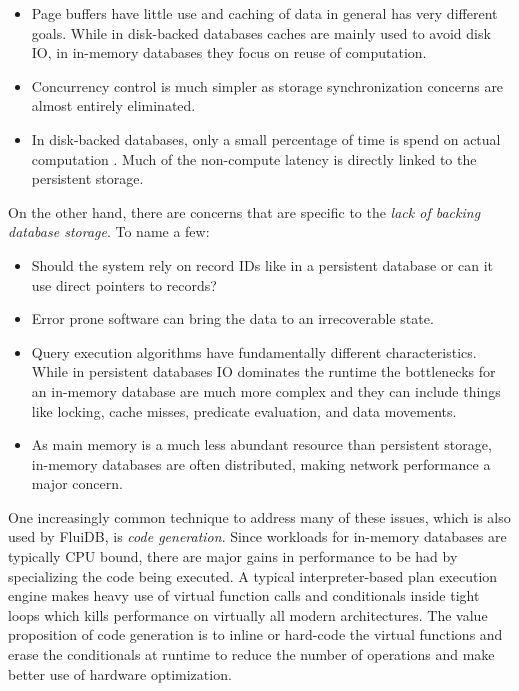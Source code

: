 \begin{itemize}
\item Page buffers have little use and caching of data in general has very
different goals. While in disk-backed databases caches are mainly used to
avoid disk IO, in in-memory databases they focus on reuse of computation.
\item Concurrency control is much simpler as storage synchronization
concerns are almost entirely eliminated.
\item In disk-backed databases, only a small percentage of time is spend on
actual computation \cite{harizopoulosOLTPLookingGlass2018}. Much of
the non-compute latency is directly linked to the persistent
storage.
\end{itemize}

On the other hand, there are concerns that are specific to the
\emph{lack of backing database storage}. To name a few:

\begin{itemize}
\item Should the system rely on record IDs like in a persistent database
or can it use direct pointers to records?
\item Error prone software can bring the data to an irrecoverable state.
\item Query execution algorithms have fundamentally different
characteristics. While in persistent databases IO dominates the
runtime the bottlenecks for an in-memory database are much more
complex and they can include things like locking, cache misses,
predicate evaluation, and data movements.
\item As main memory is a much less abundant resource than persistent
storage, in-memory databases are often distributed, making network performance a
major concern.
\end{itemize}

One increasingly common technique to address many of these issues,
which is also used by FluiDB, is \emph{code generation}. Since
workloads for in-memory databases are typically CPU bound, there are
major gains in performance to be had by specializing the code being
executed. A typical interpreter-based plan execution engine makes
heavy use of virtual function calls and conditionals inside tight
loops which kills performance on virtually all modern
architectures. The value proposition of code generation is to inline
or hard-code the virtual functions and erase the conditionals at
runtime to reduce the number of operations and make better use of
hardware optimization.

